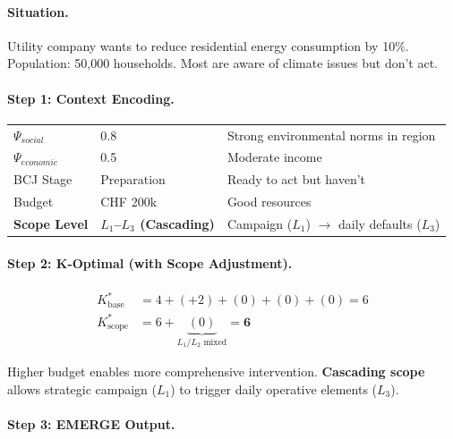 \paragraph{Situation.} Utility company wants to reduce residential energy consumption by 10\%. Population: 50,000 households. Most are aware of climate issues but don't act.

\paragraph{Step 1: Context Encoding.}

\begin{center}
\begin{tabular}{@{}lll@{}}
\toprule
$\Psi_{social}$ & 0.8 & Strong environmental norms in region \\
$\Psi_{economic}$ & 0.5 & Moderate income \\
BCJ Stage & Preparation & Ready to act but haven't \\
Budget & CHF 200k & Good resources \\
\textbf{Scope Level} & \textbf{$L_1$--$L_3$ (Cascading)} & Campaign ($L_1$) $\to$ daily defaults ($L_3$) \\
\bottomrule
\end{tabular}
\end{center}

\paragraph{Step 2: K-Optimal (with Scope Adjustment).}

\begin{align}
K^*_{\text{base}} &= 4 + (+2) + (0) + (0) + (0) = 6 \\
K^*_{\text{scope}} &= 6 + \underbrace{(0)}_{L_1/L_2 \text{ mixed}} = \mathbf{6}
\end{align}

Higher budget enables more comprehensive intervention. \textbf{Cascading scope} allows strategic campaign ($L_1$) to trigger daily operative elements ($L_3$).

\paragraph{Step 3: EMERGE Output.}

